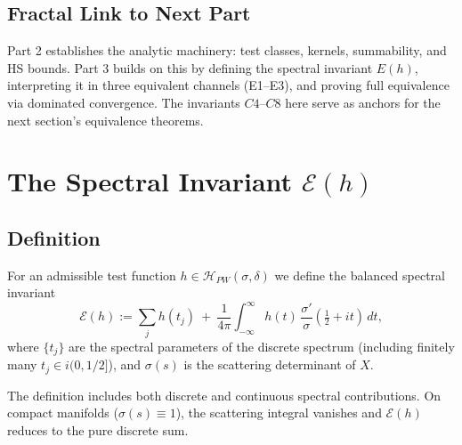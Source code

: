 \subsection*{Fractal Link to Next Part}

Part 2 establishes the analytic machinery: test classes, kernels, summability, and HS bounds.
Part 3 builds on this by defining the spectral invariant $E(h)$, interpreting it in three equivalent channels (E1–E3), and proving full equivalence via dominated convergence. 
The invariants $C4$–$C8$ here serve as anchors for the next section’s equivalence theorems.


\section{The Spectral Invariant $\mathcal{E}(h)$}
\label{sec:spectral-invariant}

\subsection{Definition}

\begin{definition}
\label{def:Eh}
For an admissible test function $h \in \mathcal{H}_{PW}(\sigma,\delta)$ we define the balanced spectral invariant
\[
\mathcal{E}(h) :=
\sum_{j} h(t_j) \ +\ \frac{1}{4\pi}\int_{-\infty}^\infty h(t)\,\frac{\sigma'}{\sigma}\!\left(\tfrac{1}{2}+it\right)\,dt,
\]
where $\{t_j\}$ are the spectral parameters of the discrete spectrum (including finitely many $t_j \in i(0,1/2]$), and $\sigma(s)$ is the scattering determinant of $X$.
\end{definition}

\begin{remark}
The definition includes both discrete and continuous spectral contributions. On compact manifolds ($\sigma(s) \equiv 1$), the scattering integral vanishes and $\mathcal{E}(h)$ reduces to the pure discrete sum.
\end{remark}

